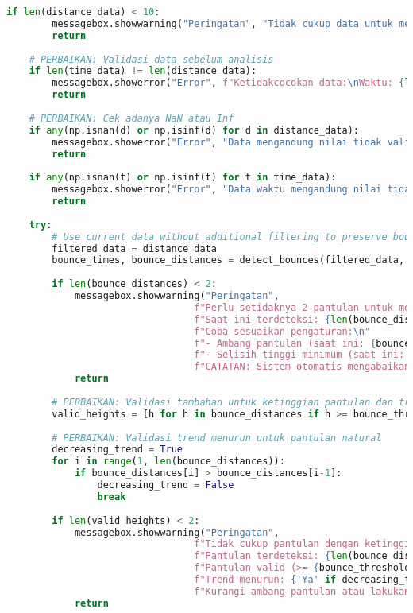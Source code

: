 \begin{itemize}
\begin{scriptsize}
\begin{lstlisting}[language=python]
    if len(distance_data) < 10:
        messagebox.showwarning("Peringatan", "Tidak cukup data untuk menghitung koefisien\nMinimum diperlukan: 10 titik data")
        return
    
    # PERBAIKAN: Validasi data sebelum analisis
    if len(time_data) != len(distance_data):
        messagebox.showerror("Error", f"Ketidakcocokan data:\nWaktu: {len(time_data)}\nJarak: {len(distance_data)}")
        return
    
    # PERBAIKAN: Cek adanya NaN atau Inf
    if any(np.isnan(d) or np.isinf(d) for d in distance_data):
        messagebox.showerror("Error", "Data mengandung nilai tidak valid (NaN/Inf)")
        return
    
    if any(np.isnan(t) or np.isinf(t) for t in time_data):
        messagebox.showerror("Error", "Data waktu mengandung nilai tidak valid (NaN/Inf)")
        return
    
    try:
        # Use current data without additional filtering to preserve bounce patterns
        filtered_data = distance_data
        bounce_times, bounce_distances = detect_bounces(filtered_data, time_data)
        
        if len(bounce_distances) < 2:
            messagebox.showwarning("Peringatan", 
                                 f"Perlu setidaknya 2 pantulan untuk menghitung koefisien\n"
                                 f"Saat ini terdeteksi: {len(bounce_distances)} pantulan\n"
                                 f"Coba sesuaikan pengaturan:\n"
                                 f"- Ambang pantulan (saat ini: {bounce_threshold}cm)\n"
                                 f"- Selisih tinggi minimum (saat ini: {min_height_difference}cm)\n"
                                 f"CATATAN: Sistem otomatis mengabaikan puncak yang naik (tidak wajar)")
            return
        
        # PERBAIKAN: Validasi tambahan untuk ketinggian pantulan dan trend menurun
        valid_heights = [h for h in bounce_distances if h >= bounce_threshold]
        
        # PERBAIKAN: Validasi trend menurun untuk pantulan natural
        decreasing_trend = True
        for i in range(1, len(bounce_distances)):
            if bounce_distances[i] > bounce_distances[i-1]:
                decreasing_trend = False
                break
        
        if len(valid_heights) < 2:
            messagebox.showwarning("Peringatan", 
                                 f"Tidak cukup pantulan dengan ketinggian minimal {bounce_threshold}cm\n"
                                 f"Pantulan terdeteksi: {len(bounce_distances)}\n"
                                 f"Pantulan valid (>= {bounce_threshold}cm): {len(valid_heights)}\n"
                                 f"Trend menurun: {'Ya' if decreasing_trend else 'Tidak'}\n"
                                 f"Kurangi ambang pantulan atau lakukan pengukuran ulang")
            return
        

\end{lstlisting}
\end{scriptsize}
\end{itemize}
